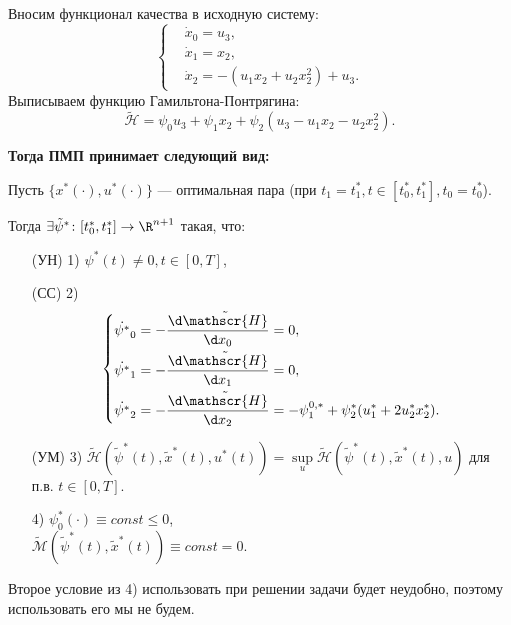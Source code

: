 Вносим функционал качества в исходную систему:
$$
    \left\{
        \begin{aligned}
            & \dot{x}_0 = u_3, \\
            & \dot{x}_1 = x_2, \\
            & \dot{x}_2 = - (u_1 x_2 + u_2 x_2^2) + u_3.
        \end{aligned}
    \right.
$$
Выписываем функцию Гамильтона-Понтрягина:
$$
    \tilde{\mathscr{H}} = \psi_0 u_3 + \psi_1 x_2 + \psi_2 (u_3 - u_1 x_2 - u_2x_2^2).
$$

\textbf{Тогда ПМП принимает следующий вид:}

Пусть $\{x^*(\cdot), u^*(\cdot)\}$ --- оптимальная пара (при $t_1 = t_1^*, t \in [t_0^*, t_1^*], t_0 = t_0^*$).

Тогда $\exists \tilde{\psi}^* \colon [t_0^*, t_1^*] \to \R^{n+1}$ такая, что:
\begin{enumerate}
    \item[(УН) 1)] $\psi^*(t) \neq 0, t \in [0, T]$,
    \item[(СС) 2)] 
    $$
        \left\{
            \begin{aligned}
                & \dot{\psi^*}_0 = -\frac{\d \tilde{\mathscr{H}}}{\d x_0} = 0, \\
                & \dot{\psi^*}_1 = -\frac{\d \tilde{\mathscr{H}}}{\d x_1} = 0, \\
                & \dot{\psi^*}_2 = -\frac{\d \tilde{\mathscr{H}}}{\d x_2} = -\psi_1^{0,*} + \psi_2^* (u_1^* + 2 u_2^* x_2^*).
            \end{aligned}
        \right.
    $$
    \item[(УМ) 3)] $\tilde{\mathscr{H}}(\tilde{\psi}^*(t), \tilde{x}^*(t), u^*(t)) = \sup\limits_{u} \tilde{\mathscr{H}}(\tilde{\psi}^*(t), \tilde{x}^*(t), u)$ для п.в. $t \in [0, T]$.
    \item[4)] $\psi_0^* (\cdot) \equiv const \leqslant 0$, \\
            $\tilde{\mathscr{M}}(\tilde{\psi}^*(t), \tilde{x}^*(t)) \equiv const = 0$.
\end{enumerate}

Второе условие из 4) использовать при решении задачи будет неудобно, поэтому использовать его мы не будем.


